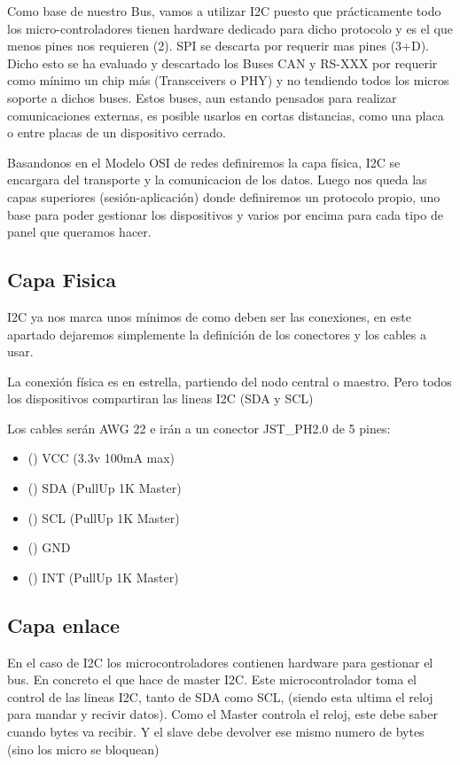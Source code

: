 
Como base de nuestro Bus, vamos a utilizar I2C puesto que prácticamente todo los micro-controladores tienen %
hardware dedicado para dicho protocolo y es el que menos pines nos requieren (2). SPI se descarta por requerir
mas pines (3+D). Dicho esto se ha evaluado y descartado los Buses CAN y RS-XXX por requerir como mínimo un chip %
más (Transceivers o PHY) y no tendiendo todos los micros soporte a dichos buses. Estos buses, aun estando
pensados para realizar comunicaciones externas, es posible usarlos en cortas distancias, como una placa o entre
placas de un dispositivo cerrado.

Basandonos en el Modelo OSI de redes definiremos la capa física, I2C se encargara del transporte y la
comunicacion de los datos. Luego nos queda las capas superiores (sesión-aplicación) donde definiremos un %
protocolo propio, uno base para poder gestionar los dispositivos y varios por encima para cada tipo de panel
que queramos hacer.

\subsection{Capa Fisica}
I2C ya nos marca unos mínimos de como deben ser las conexiones, en este apartado dejaremos simplemente la
definición de los conectores y los cables a usar.

La conexión física es en estrella, partiendo del nodo central o maestro. Pero todos los dispositivos compartiran
las lineas I2C (SDA y SCL)

Los cables serán AWG 22 e irán a un conector JST\_PH2.0 de 5 pines:

\begin{itemize}
    \item() VCC (3.3v 100mA max)
    \item() SDA (PullUp 1K Master)
    \item() SCL (PullUp 1K Master)
    \item() GND
    \item() INT (PullUp 1K Master)
\end{itemize}


\subsection{Capa enlace}
En el caso de I2C los microcontroladores contienen hardware para gestionar el bus. En concreto el que hace de
master I2C. Este microcontrolador toma el control de las lineas I2C, tanto de SDA como SCL, (siendo esta ultima
el reloj para mandar y recivir datos). Como el Master controla el reloj, este debe saber cuando bytes va recibir.
Y el slave debe devolver ese mismo numero de bytes (sino los micro se bloquean)

